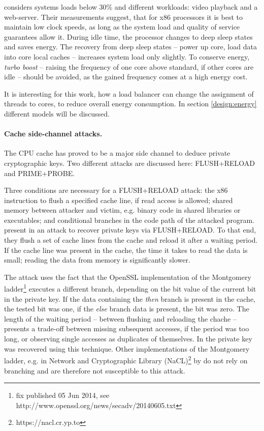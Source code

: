 \cite{le_sueur_slow_2011} considers systems loads below 30\% and different
workloads: video playback and a web-server.
Their measurements suggest, that for x86 processors it is best to maintain low
clock speeds, as long as the system load and quality of service guarantees
allow it.
During idle time, the processor changes to deep sleep states and saves
energy.
The recovery from deep sleep states -- power up core, load data into core local
caches -- increases system load only slightly.
To conserve energy, \emph{turbo boost} -- raising the frequency
of one core above standard, if other cores are idle -- should be avoided, as
the gained frequency comes at a high energy cost.

It is interesting for this work, how a load balancer can change the assignment
of threads to cores, to reduce overall energy consumption.
In section \ref{design:energy} different models will be discussed.
\\

\paragraph{Cache side-channel attacks.}
The CPU cache has proved to be a major side channel to deduce private
cryptographic keys.
Two different attacks are discussed here: FLUSH+RELOAD and PRIME+PROBE.

Three conditions are necessary for a FLUSH+RELOAD attack:
the x86 instruction to flush a specified cache line, if read access is allowed;
shared memory between attacker and victim, e.g. binary
code in shared libraries or executables;
and conditional branches in the code path of the attacked program.
\citeauthor{yarom_recovering_2014} present in \cite{yarom_recovering_2014} an
attack to recover private keys via FLUSH+RELOAD.
To that end, they flush a set of cache lines from the cache and reload it after a
waiting period.
If the cache line was present in the cache, the time it takes to read the data
is small; reading the data from memory is significantly slower.

The attack uses the fact that the OpenSSL implementation of the Montgomery
ladder\footnote{fix published 05 Jun 2014, see
http://www.openssl.org/news/secadv/20140605.txt}
executes a different branch, depending on the bit value of the current
bit in the private key.
If the data containing the \textit{then} branch is present in the cache, the
tested bit was one, if the \textit{else} branch data is present, the bit was
zero.
The length of the waiting period -- between flushing and reloading the chache
-- presents a trade-off between missing subsequent accesses, if the period was
too long, or observing single accesses as duplicates of themselves.
In \cite{yarom_recovering_2014} the private key was recovered using this
technique.
Other implementations of the Montgomery ladder, e.g. in Network and
Cryptographic Library (NaCL)\footnote{https://nacl.cr.yp.to} by
\citeauthor{bernstein_security_2012}
do not rely on branching and are therefore not susceptible to this attack.

